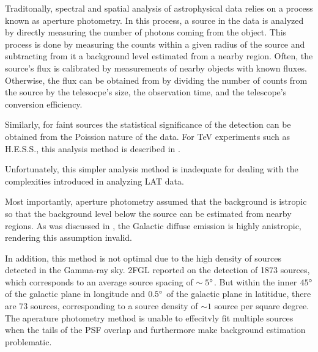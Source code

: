 
Traditonally, spectral and spatial analysis of astrophysical data
relies on a process known as aperture photometry.  In this process,
a source in the data is analyzed by directly measuring the number of
photons coming from the object. This process is done by measuring the
counts within a given radius of the source and subtracting from it a
background level estimated from a nearby region.  Often, the source's
flux is calibrated by measurements of nearby objects with known fluxes.
Otherwise, the flux can be obtained from by dividing the number of
counts from the source by the telesocpe's size, the observation time,
and the telescope's conversion efficiency.

Similarly, for faint sources the statistical significance of the
detection can be obtained from the Poission nature of the data. For
TeV experiments such as H.E.S.S., this analysis method is described in
\cite{li_1983_analysis-methods}.

Unfortunately, this simpler analysis method is inadequate for dealing
with the complexities introduced in analyzing LAT data.  

Most importantly, aperture photometry assumed that the
background is istropic so that the background level below the source
can be estimated from nearby regions.
As was discussed in ,
the Galactic diffuse emission is highly anistropic,
rendering this assumption invalid.





In addition,
this method is not optimal due to the high density of sources
detected in the Gamma-ray sky.  \Gls{2FGL} reported on the detection
of 1873 sources, which corresponds to an average source spacing of
$\sim5^\circ$.  But within the inner $45^\circ$ of the galactic plane
in longitude and $0.5^\circ$ of the galactic plane in latitidue, there
are 73 sources, corresponding to a source density of $\sim 1$ source per
square degree.  The aperature photometry method is unable to effecitvly
fit multiple sources when the tails of the PSF overlap and furthermore
make background estimation problematic.

